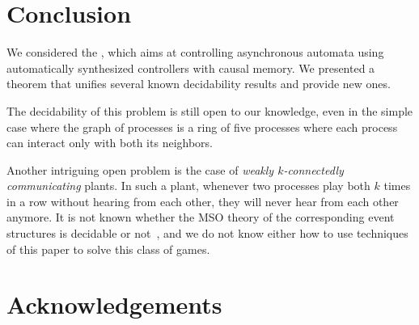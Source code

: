 \documentclass[a4paper,UKenglish]{lipics-v2016}
\begin{document}
\section*{Conclusion}
We considered the \dsp,
which aims at controlling asynchronous automata
using automatically 
synthesized controllers with causal memory.
We presented a theorem that unifies several known decidability results and provide new ones.

The decidability of this problem is still open to our knowledge, even in the simple case where the graph of processes is a ring of five processes where each process can interact only with both its  neighbors.

Another intriguing open problem is the case of \emph{weakly $k$-connectedly communicating} plants.
In such a plant, whenever two processes play both $k$ times in a row without hearing from each other,
they will never hear from each other anymore. 
It is not known whether the MSO theory of
the corresponding event structures is decidable or not~\cite{madhu},
and we do not know either how to use techniques of this paper to solve this class of games.

\section*{Acknowledgements}
\end{document}

